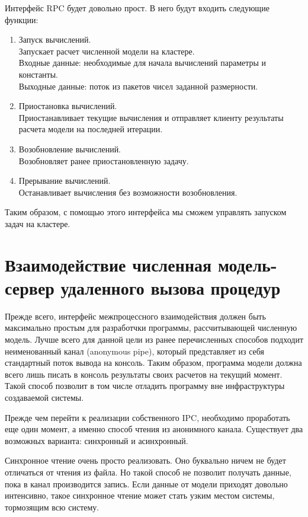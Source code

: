 \documentclass[a4paper,14pt,indentfirst]{extreport}
\begin{document}
Интерфейс RPC будет довольно прост. В него будут входить следующие функции:
\begin{enumerate}
  \item Запуск вычислений.\\ Запускает расчет численной модели на кластере.\\ Входные данные: необходимые для начала вычислений параметры и константы.\\ Выходные данные: поток из пакетов чисел заданной размерности.
  \item Приостановка вычислений.\\ Приостанавливает текущие вычисления и отправляет клиенту результаты расчета модели на последней итерации.
  \item Возобновление вычислений.\\ Возобновляет ранее приостановленную задачу.
  \item Прерывание вычислений.\\ Останавливает вычисления без возможности возобновления.
\end{enumerate}
Таким образом, с помощью этого интерфейса мы сможем управлять запуском задач на кластере.
\section{Взаимодействие численная модель-сервер удаленного вызова процедур}
Прежде всего, интерфейс межпроцессного взаимодействия должен быть максимально простым для разработчки программы, рассчитывающей численную модель. Лучше всего для данной цели из ранее перечисленных способов подходит неименованный канал (anonymous pipe), который представляет из себя стандартный поток вывода на консоль. Таким образом, программа модели должна всего лишь писать в консоль результаты своих расчетов на текущий момент. Такой способ позволит в том числе отладить программу вне инфраструктуры создаваемой системы.

Прежде чем перейти к реализации собственного IPC, необходимо проработать еще один момент, а именно способ чтения из анонимного канала. Существует два возможных варианта: синхронный и асинхронный.

Синхронное чтение очень просто реализовать. Оно буквально ничем не будет отличаться от чтения из файла. Но такой способ не позволит получать данные, пока в канал производится запись. Если данные от модели приходят довольно интенсивно, такое синхронное чтение может стать узким местом системы, тормозящим всю систему.
\end{document}
